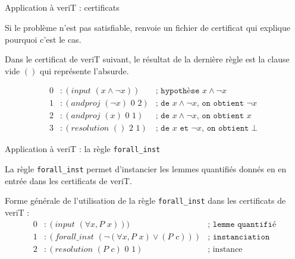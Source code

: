 \documentclass{beamer}
\begin{document}
    \subsection{}
    \begin{frame}{Application à veriT : certificats}

      Si le problème n'est pas satisfiable, renvoie un fichier de certificat qui explique pourquoi c'est le cas.

      \hspace{1cm}

      Dans le certificat de veriT suivant, le résultat de la dernière règle est la clause vide $()$ qui représente l'absurde.

      \begin{align*}
        0&:(input\,\,(x \wedge \neg x)) &\texttt{; hypothèse } x \wedge \neg x\\
        1&:(andproj \,\,(\neg x) \,\,0\,\, 2) &\texttt{; de } x \wedge \neg x \texttt{, on obtient } \neg x \\
        2&:(andproj \,\,(x)\,\, 0\,\, 1) &\texttt{; de } x \wedge \neg x \texttt{, on obtient }  x\\
        3&:(resolution \,\,() \,\,2\,\, 1) &\texttt{; de } x \texttt{ et } \neg x \texttt{, on obtient} \perp
      \end{align*}



    \end{frame}


    \begin{frame}{Application à veriT : la règle \texttt{forall\_inst}}

      La règle \texttt{forall\_inst} permet d'instancier les lemmes quantifiés donnés en en entrée dans les certificats de veriT.

      \vspace{1cm}

      Forme générale de l'utilisation de la règle \texttt{forall\_inst} dans les certificats de veriT :
      \begin{align*}
        0&:(input \,\,(\forall x, P \,\, x))) &\texttt{; lemme quantifié} \\
        1&:(forall\_inst \,\,(\neg (\forall x, P \,\, x) \vee (P \, \, c) )) &\texttt{; instanciation} \\
        2&:(resolution  \,\, (P \,\,c) \,\,0 \,\,1) & \text{; instance}
      \end{align*}

    \end{frame}
\end{document}
